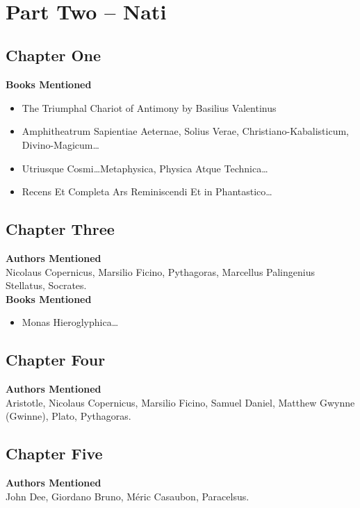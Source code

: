 \documentclass[12pt,makeidx]{extreport}
\newcommand\fleuron{\begin{turn}{45}\Large \ding{166}\end{turn}}
\newcommand\doublefleuron{%
	\reflectbox{\fleuron}\AC\staveXLIX\reflectbox{\AC}\fleuron}
\newcommand\fleuronbar{%
	{\huge\LinearACCCXIII}\xrfill[1.3ex]{1pt}\doublefleuron\xrfill[1.3ex]{1pt}\reflectbox{\huge\LinearACCCXIII}}
\newcommand\nbvspace[1][3]{\vspace*{\stretch{#1}}}
\begin{document}
\begin{center}
\vfill
\shadowoffset{1pt}
\\
\nbvspace[1]
\end{center}

\chapter{Part Two -- Nati}
\section{Chapter One}
\textbf{Books Mentioned}
\begin{itemize}
\item The Triumphal Chariot of Antimony by Basilius Valentinus \parencite{Valentinus.1893}
\item Amphitheatrum Sapientiae Aeternae, Solius Verae, Christiano-Kabalisticum, Divino-Magicum\ldots \parencite{Khunrath1609}
\item Utriusque Cosmi\ldots Metaphysica, Physica Atque Technica\ldots \parencite{Fludd1617}
\item Recens Et Completa Ars Reminiscendi Et in Phantastico\ldots \parencite{Bruno1583a}
\end{itemize}

\section{Chapter Three}
\textbf{Authors Mentioned}\\
Nicolaus Copernicus, Marsilio Ficino, Pythagoras, Marcellus Palingenius Stellatus, Socrates.
\\

\hspace{-1.5em}\textbf{Books Mentioned}
\begin{itemize}
\item Monas Hieroglyphica\ldots \parencite{Dee1564}
\end{itemize}

\section{Chapter Four}
\textbf{Authors Mentioned}\\
Aristotle, Nicolaus Copernicus, Marsilio Ficino, Samuel Daniel, Matthew Gwynne (Gwinne), Plato, Pythagoras.

\section{Chapter Five}
\textbf{Authors Mentioned}\\
John Dee, Giordano Bruno, Méric Casaubon, Paracelsus.
\\
\end{document}
